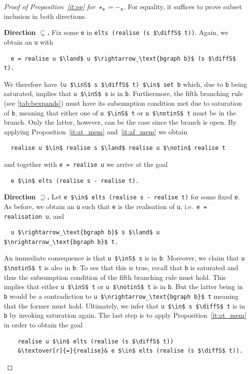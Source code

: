 \documentclass[
  sigplan,
  10pt,
  ]{acmart}
\newcommand{\textover}[3][l]{%
 \makebox[\widthof{#3}][#1]{#2}%
}
\newcommand{\diffS}{-_\text{s}}
\newcommand{\inS}{\in_\text{s}}
\newcommand{\notinS}{\notin_\text{s}}
\begin{document}
\begin{proof}[Proof of Proposition~\ref{it:op} for $\star_\texttt{s} = -_\texttt{s}$]
  For equality, it suffices to prove subset inclusion in both directions.

  \textbf{Direction $\subseteq$. } Fix some \lstinline!e! in \lstinline!elts (realise (s $\diffS$ t))!.
  Again, we obtain an \lstinline!u! with 
\begin{lstlisting}
  e = realise u $\land$ u $\rightarrow_\text{bgraph b}$ (s $\diffS$ t).
\end{lstlisting}
  We therefore have \lstinline!(u $\inS$ s $\diffS$ t) $\in$ set b! which, due to \lstinline!b! being saturated, implies that \lstinline!u $\inS$ s! is in \lstinline!b!.
  Furthermore, the fifth branching rule (see \autoref{tab:bexpands}) must have its subsumption condition met due to saturation of \lstinline!b!, meaning that either one of \lstinline!u $\inS$ t! or \lstinline!u $\notinS$ t! must be in the branch.
  Only the latter, however, can be the case since the branch is open.
  By applying Proposition~\ref{it:at_mem} and~\ref{it:af_mem} we obtain
\begin{lstlisting}
  realise u $\in$ realise s $\land$ realise u $\notin$ realise t
\end{lstlisting}
  and together with \lstinline!e = realise u! we arrive at the goal 
\begin{lstlisting}
  e $\in$ elts (realise s - realise t).
\end{lstlisting}

\textbf{Direction $\supseteq$. } Let \lstinline[columns=fullflexible]!e $\in$ elts (realise s - realise t)! for some fixed \lstinline!e!.
  As before, we obtain an \lstinline!u! such that \lstinline!e! is the realisation of \lstinline!u!, i.e.\ \lstinline!e = realisation u!, and
\begin{lstlisting}
  u $\rightarrow_\text{bgraph b}$ s $\land$ u $\nrightarrow_\text{bgraph b}$ t.
\end{lstlisting}
  An immediate consequence is that \lstinline!u $\inS$ s! is in \lstinline!b!.
  Moreover, we claim that \lstinline!u $\notinS$ t! is also in \lstinline!b!.
  To see that this is true, recall that \lstinline!b! is saturated and thus the subsumption condition of the fifth branching rule must hold.
  This implies that either \lstinline!u $\inS$ t! or \lstinline!u $\notinS$ t! is in \lstinline!b!.
  But the latter being in \lstinline!b! would be a contradiction to \lstinline!u $\nrightarrow_\text{bgraph b}$ t! meaning that the former must hold.
  Ultimately, we infer that \lstinline!u $\in$ s $\diffS$ t! is in \lstinline!b! by invoking saturation again.
  The last step is to apply Proposition~\ref{it:at_mem} in order to obtain the goal
  \begin{lstlisting}
    realise u $\in$ elts (realise (s $\diffS$ t))
    &\textover[r]{=}{realise}& e $\in$ elts (realise (s $\diffS$ t)).
  \end{lstlisting}
\end{proof}
\end{document}
